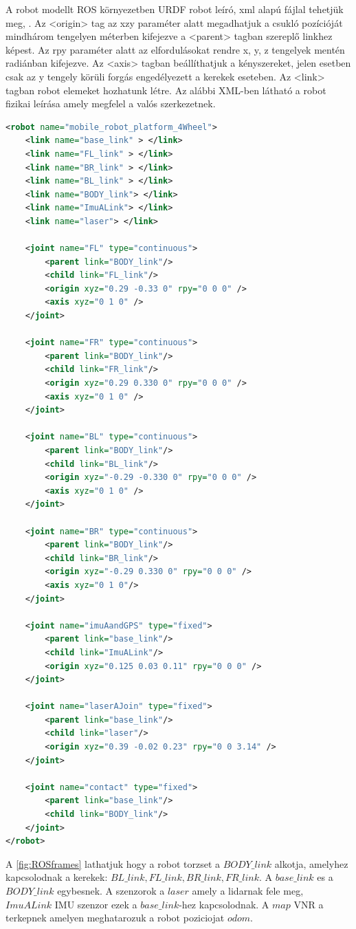 A robot modellt ROS környezetben URDF robot leíró, xml alapú fájlal tehetjük meg, \cite{rosURDF}
\cite{rosJoint} \cite{rosLink}.
Az <origin> tag az xzy paraméter alatt megadhatjuk a csukló pozícióját mindhárom tengelyen méterben kifejezve a <parent> tagban szereplő linkhez képest. Az rpy paraméter alatt az elfordulásokat rendre x, y, z tengelyek mentén radiánban kifejezve.
Az <axis> tagban beállíthatjuk a kényszereket, jelen esetben csak az y tengely körüli forgás engedélyezett a kerekek eseteben. 
Az <link> tagban robot elemeket hozhatunk létre. Az alábbi XML-ben látható a robot fizikai leírása amely megfelel a valós szerkezetnek.
\begin{lstlisting}[language=XML]
<robot name="mobile_robot_platform_4Wheel">
	<link name="base_link" > </link>
	<link name="FL_link" > </link>
	<link name="BR_link" > </link>
	<link name="BL_link" > </link>
	<link name="BODY_link"> </link>  
	<link name="ImuALink"> </link>  
	<link name="laser"> </link> 

	<joint name="FL" type="continuous">
		<parent link="BODY_link"/>
		<child link="FL_link"/>    
		<origin xyz="0.29 -0.33 0" rpy="0 0 0" />
		<axis xyz="0 1 0" />
	</joint>

	<joint name="FR" type="continuous">
		<parent link="BODY_link"/>
		<child link="FR_link"/>    
		<origin xyz="0.29 0.330 0" rpy="0 0 0" />
		<axis xyz="0 1 0" />
	</joint>

	<joint name="BL" type="continuous">
		<parent link="BODY_link"/>
		<child link="BL_link"/>
		<origin xyz="-0.29 -0.330 0" rpy="0 0 0" />
		<axis xyz="0 1 0" />
	</joint>

	<joint name="BR" type="continuous">
		<parent link="BODY_link"/>
		<child link="BR_link"/>     
		<origin xyz="-0.29 0.330 0" rpy="0 0 0" />
		<axis xyz="0 1 0"/>
	</joint>

	<joint name="imuAandGPS" type="fixed">
		<parent link="base_link"/>
		<child link="ImuALink"/>
		<origin xyz="0.125 0.03 0.11" rpy="0 0 0" />
	</joint>

	<joint name="laserAJoin" type="fixed">
		<parent link="base_link"/>
		<child link="laser"/>
		<origin xyz="0.39 -0.02 0.23" rpy="0 0 3.14" />
	</joint>  

	<joint name="contact" type="fixed">
		<parent link="base_link"/>
		<child link="BODY_link"/>
	</joint> 
</robot>
\end{lstlisting}

A \ref{fig:ROSframes} lathatjuk hogy a robot torzset a $BODY\_link$ alkotja, amelyhez kapcsolodnak a kerekek: $BL\_link,FL\_link,BR\_link,FR\_link$. A $base\_link$ es a $BODY\_link$ egybesnek. A szenzorok a $laser$ amely a lidarnak fele meg, $ImuALink$ IMU szenzor ezek a $base\_link$-hez kapcsolodnak.
A $map$ VNR a terkepnek amelyen meghatarozuk a robot poziciojat $odom$.

\renewcommand{\img}{SajatRobot/ROS/frames.svg}
\renewcommand{\sources}{*}
\renewcommand{\svg}{svg}
\renewcommand{\aspectratioPic}{1.5}
\renewcommand{\rotationAnglePic}{90}
\renewcommand{\captionn}{A megvalositott robot VNR-k közti reláció }
\renewcommand{\figlabel}{ROSframes}



